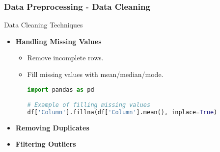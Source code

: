\documentclass{beamer}
\begin{document}
\begin{frame}[fragile]
    \frametitle{Data Preprocessing - Data Cleaning}
    \begin{block}{Data Cleaning Techniques}
        \begin{itemize}
            \item \textbf{Handling Missing Values}
            \begin{itemize}
                \item Remove incomplete rows.
                \item Fill missing values with mean/median/mode.
                \begin{lstlisting}[language=Python]
import pandas as pd

# Example of filling missing values
df['Column'].fillna(df['Column'].mean(), inplace=True)
                \end{lstlisting}
            \end{itemize}
            \item \textbf{Removing Duplicates}
            \item \textbf{Filtering Outliers}
        \end{itemize}
    \end{block}
\end{frame}
\end{document}
